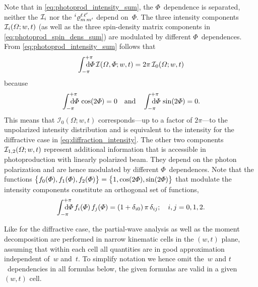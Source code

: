 Note that in \cref{eq:photoprod_intensity_sum}, the $\Phi$~dependence
is separated, \ie neither the $\mathcal{I}_i$ nor the
$\prescript{i}{}{\varrho}^{\ell\, \ell'}_{m\, m'}$ depend on~$\Phi$.
The three intensity components $\mathcal{I}_i(\Omega; w, t)$ (as well
as the three spin-density matrix components in
\cref{eq:photoprod_spin_dens_sum}) are modulated by different
$\Phi$~dependences.  From \cref{eq:photoprod_intensity_sum} follows
that
\begin{equation}
  \label{eq:photoprod_unpolarized_intensity}
  \int_{-\pi}^{+\pi}\hspace{-1.2em} \dif{\Phi}\, \intensity(\Omega, \Phi; w, t)
  = 2 \pi\, \intensity_0(\Omega; w, t)
\end{equation}
because
\begin{equation}
  \int_{-\pi}^{+\pi}\hspace{-1.2em} \dif{\Phi}\, \cos(2 \Phi)
  = 0
  \quad\text{and}\quad
  \int_{-\pi}^{+\pi}\hspace{-1.2em} \dif{\Phi}\, \sin(2 \Phi)
  = 0.
\end{equation}
This means that $\mathcal{I}_0(\Omega; w, t)$ corresponds---up to a
factor of $2 \pi$---to the unpolarized intensity distribution and is
equivalent to the intensity for the diffractive case in
\cref{eq:diffraction_intensity}.  The other two components
$\mathcal{I}_{1, 2}(\Omega; w, t)$ represent additional information
that is accessible in photoproduction with linearly polarized beam.
They depend on the photon polarization and are hence modulated by
different $\Phi$~dependences.  Note that the functions
$\cBrk[1]{f_0(\Phi), f_1(\Phi), f_2(\Phi)} = \cBrk[1]{1, \cos(2 \Phi),
\sin(2 \Phi)}$ that modulate the intensity components constitute an
orthogonal set of functions, \ie
\begin{equation}
  \label{eq:photoprod_orthogonality_phi}
  \int_{-\pi}^{+\pi}\hspace{-1.2em} \dif{\Phi}\, f_i(\Phi)\, f_j(\Phi)
  = (1 + \delta_{i 0})\, \pi\, \delta_{i j};
  \quad i, j = 0 ,1, 2.
\end{equation}

Like for the diffractive case, the partial-wave analysis as well as
the moment decomposition are performed in narrow kinematic cells in
the $(w, t)$ plane, assuming that within each cell all quantities are
in good approximation independent of~$w$ and~$t$.  To simplify
notation we hence omit the~$w$ and $t$~dependencies in all formulas
below, \ie the given formulas are valid in a given $(w, t)$ cell.

